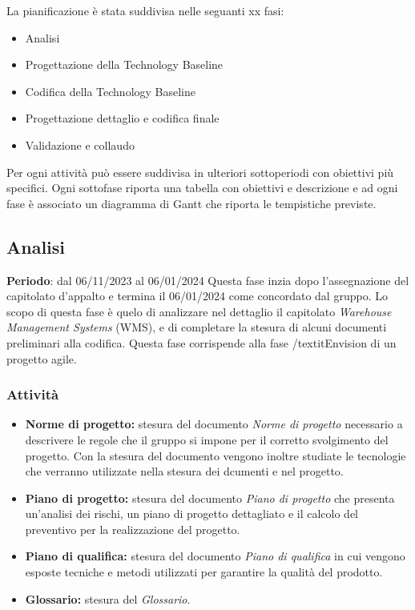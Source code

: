 La pianificazione è stata suddivisa nelle seguanti xx fasi:

\begin{itemize}
    \item Analisi
    \item Progettazione della Technology Baseline
    \item Codifica della Technology Baseline
    \item Progettazione dettaglio e codifica finale
    \item Validazione e collaudo
\end{itemize}

Per ogni attività può essere suddivisa in ulteriori sottoperiodi con obiettivi più specifici. Ogni sottofase riporta una tabella con obiettivi e descrizione e ad ogni fase è associato un diagramma di Gantt che riporta le tempistiche previste.

\subsection{Analisi}\label{sec:pianificazione:analisi}

\textbf{Periodo}: dal 06/11/2023 al 06/01/2024
Questa fase inzia dopo l'assegnazione del capitolato d'appalto e termina il 06/01/2024 come concordato dal gruppo. Lo scopo di questa fase è quelo di analizzare nel dettaglio il capitolato \textit{Warehouse Management Systems} (WMS), e di completare la stesura di alcuni documenti preliminari alla codifica. Questa fase corrispende alla fase /textit{Envision} di un progetto agile.

\subsubsection{Attività}\label{sec:pianificazione:analisi:attivita}
\begin{itemize}
    \item \textbf{Norme di progetto:} stesura del documento \textit{Norme di progetto} necessario a descrivere le regole che il gruppo si impone per il corretto svolgimento del progetto. Con la stesura del documento vengono inoltre studiate le tecnologie che verranno utilizzate nella stesura dei dcumenti e nel progetto.
    \item \textbf{Piano di progetto:} stesura del documento \textit{Piano di progetto} che presenta un'analisi dei rischi, un piano di progetto dettagliato e il calcolo del preventivo per la realizzazione del progetto.
    \item \textbf{Piano di qualifica:} stesura del documento \textit{Piano di qualifica} in cui vengono esposte tecniche e metodi utilizzati per garantire la qualità del prodotto.
    \item \textbf{Glossario:} stesura del \textit{Glossario}.
\end{itemize}


